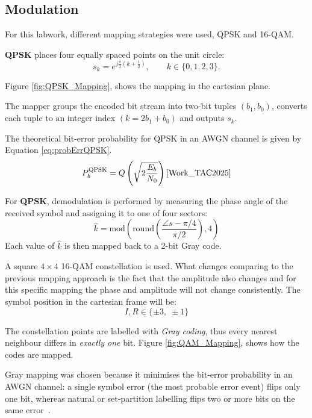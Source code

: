 \subsection{Modulation}
\label{ssec:modulations}
For this labwork, different mapping strategies were used, QPSK and 16-QAM.

\textbf{QPSK} places four equally spaced points on the unit circle:
\[
s_k = e^{j\frac{\pi}{2}\left(k+\tfrac12\right)}, \qquad k\in\{0,1,2,3\}.
\]

Figure \ref{fig:QPSK_Mapping}, shows the mapping in the cartesian plane.


The mapper groups the encoded bit stream into two-bit tuples $(b_1,b_0)$, converts each tuple to an integer index $(k =2b_1+b_0)$ and outputs \(s_k\).

The theoretical bit-error probability for QPSK in an AWGN channel is given by Equation \ref{eq:probErrQPSK}.
\begin{equation}
  P_b^{\text{QPSK}} = Q\left(\sqrt{2\frac{E_b}{N_0}}\right)\text{\cite{Work_TAC2025}}
  \label{eq:probErrQPSK}
\end{equation}

For \textbf{QPSK}, demodulation is performed by measuring the phase angle of the received symbol and assigning it to one of four sectors:
\[
\hat{k} = \text{mod}\left( \text{round}\left( \frac{\angle s - \pi/4}{\pi/2} \right), 4 \right)
\]
Each value of $\hat{k}$ is then mapped back to a 2-bit Gray code.


A square $4\times4$ 16-QAM constellation is used. What changes comparing to the previous mapping approach is the fact that the amplitude also changes and for this specific mapping the phase and amplitude will not change consistently. The symbol position in the cartesian frame will be:
\[
I,R \in \{\pm3,\;\pm1\}
\]

The constellation points are labelled with \emph{Gray coding}, thus every nearest neighbour differs in \emph{exactly one} bit. Figure \ref{fig:QAM_Mapping}, shows how the codes are mapped.

Gray mapping was chosen because it minimises the bit‑error probability in an AWGN channel: a single symbol error (the most probable error event) flips only one bit, whereas natural or set‑partition labelling flips two or more bits on the same error~\cite{Work_TAC2025}.  

